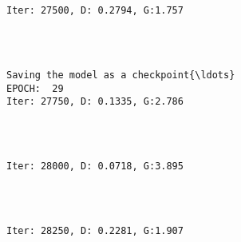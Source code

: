 \documentclass[11pt]{article}
\begin{document}
    \begin{center}
    \end{center}
    { \hspace*{\fill} \\}
    
    \begin{Verbatim}[commandchars=\\\{\}]

Iter: 27500, D: 0.2794, G:1.757
    \end{Verbatim}

    \begin{center}
    \end{center}
    { \hspace*{\fill} \\}
    
    \begin{Verbatim}[commandchars=\\\{\}]

Saving the model as a checkpoint{\ldots}
EPOCH:  29
Iter: 27750, D: 0.1335, G:2.786
    \end{Verbatim}

    \begin{center}
    \end{center}
    { \hspace*{\fill} \\}
    
    \begin{Verbatim}[commandchars=\\\{\}]

Iter: 28000, D: 0.0718, G:3.895
    \end{Verbatim}

    \begin{center}
    \end{center}
    { \hspace*{\fill} \\}
    
    \begin{Verbatim}[commandchars=\\\{\}]

Iter: 28250, D: 0.2281, G:1.907
    \end{Verbatim}
\end{document}
